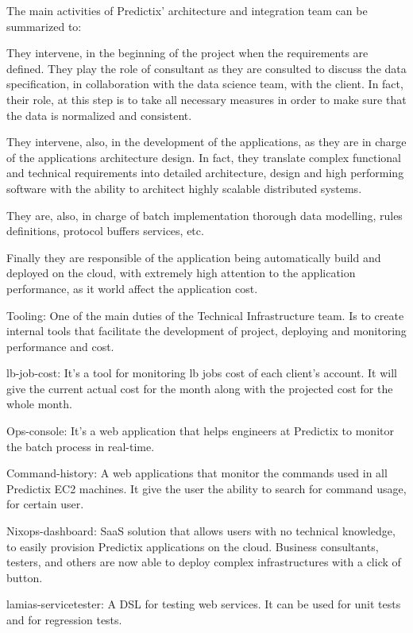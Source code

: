 The main activities of Predictix' architecture and integration team can be
summarized to:

They intervene, in the beginning of the project when the requirements are
defined. They play the role of consultant as they are consulted to discuss the
data specification, in collaboration with the data science team, with the
client. In fact, their role, at this step is to take all necessary measures in
order to make sure that the data is normalized and consistent.

They intervene, also, in the development of the applications, as they are in
charge of the applications architecture design. In fact, they translate complex
functional and technical requirements into detailed architecture, design and
high performing software with the ability to architect highly scalable
distributed systems.

They are, also, in charge of batch implementation thorough data modelling, rules
definitions, protocol buffers services, etc.

Finally they are responsible of the application being automatically build and
deployed on the cloud, with extremely high attention to the application
performance, as it world affect the application cost.

Tooling:
One of the main duties of the Technical Infrastructure team. Is to create
internal tools that facilitate the development of project, deploying and
monitoring performance and cost.

lb-job-cost: It's a tool for monitoring lb jobs cost of each client's account.
It will give the current actual cost for the month along with the projected cost
for the whole month.

Ops-console: It's a web application that helps engineers at Predictix to monitor
the batch process in real-time.

Command-history: A web applications that monitor the commands used in all
Predictix EC2 machines. It give the user the ability to search for command
usage, for certain user.

Nixops-dashboard:
SaaS solution that allows users with no technical knowledge, to easily provision
Predictix applications on the cloud.  Business consultants, testers, and others are
now able to deploy complex infrastructures with a click of button.

lamias-servicetester: A DSL for testing web services. It can be used for unit
tests and for regression tests.
